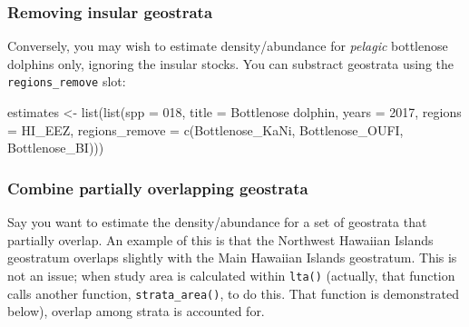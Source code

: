 \documentclass[
]{book}
\newenvironment{Shaded}{\begin{snugshade}}{\end{snugshade}}
\newcommand{\AttributeTok}[1]{\textcolor[rgb]{0.77,0.63,0.00}{#1}}
\newcommand{\DecValTok}[1]{\textcolor[rgb]{0.00,0.00,0.81}{#1}}
\newcommand{\FunctionTok}[1]{\textcolor[rgb]{0.00,0.00,0.00}{#1}}
\newcommand{\NormalTok}[1]{#1}
\newcommand{\OtherTok}[1]{\textcolor[rgb]{0.56,0.35,0.01}{#1}}
\newcommand{\StringTok}[1]{\textcolor[rgb]{0.31,0.60,0.02}{#1}}
\begin{document}
\hypertarget{removing-insular-geostrata}{%
\subsubsection*{Removing insular geostrata}\label{removing-insular-geostrata}}

Conversely, you may wish to estimate density/abundance for \emph{pelagic} bottlenose dolphins only, ignoring the insular stocks. You can substract geostrata using the \texttt{regions\_remove} slot:

\begin{Shaded}
\begin{Highlighting}[]
\NormalTok{estimates }\OtherTok{\textless{}{-}} \FunctionTok{list}\NormalTok{(}\FunctionTok{list}\NormalTok{(}\AttributeTok{spp =} \StringTok{\textquotesingle{}018\textquotesingle{}}\NormalTok{,}
                       \AttributeTok{title =} \StringTok{\textquotesingle{}Bottlenose dolphin\textquotesingle{}}\NormalTok{,}
                       \AttributeTok{years =} \DecValTok{2017}\NormalTok{,}
                       \AttributeTok{regions =} \StringTok{\textquotesingle{}HI\_EEZ\textquotesingle{}}\NormalTok{,}
                       \AttributeTok{regions\_remove =} \FunctionTok{c}\NormalTok{(}\StringTok{\textquotesingle{}Bottlenose\_KaNi\textquotesingle{}}\NormalTok{,}
                                          \StringTok{\textquotesingle{}Bottlenose\_OUFI\textquotesingle{}}\NormalTok{,}
                                          \StringTok{\textquotesingle{}Bottlenose\_BI\textquotesingle{}}\NormalTok{)))}
\end{Highlighting}
\end{Shaded}

\hypertarget{combine-partially-overlapping-geostrata}{%
\subsubsection*{Combine partially overlapping geostrata}\label{combine-partially-overlapping-geostrata}}

Say you want to estimate the density/abundance for a set of geostrata that partially overlap. An example of this is that the Northwest Hawaiian Islands geostratum overlaps slightly with the Main Hawaiian Islands geostratum. This is not an issue; when study area is calculated within \texttt{lta()} (actually, that function calls another function, \texttt{strata\_area()}, to do this. That function is demonstrated below), overlap among strata is accounted for.
\end{document}
